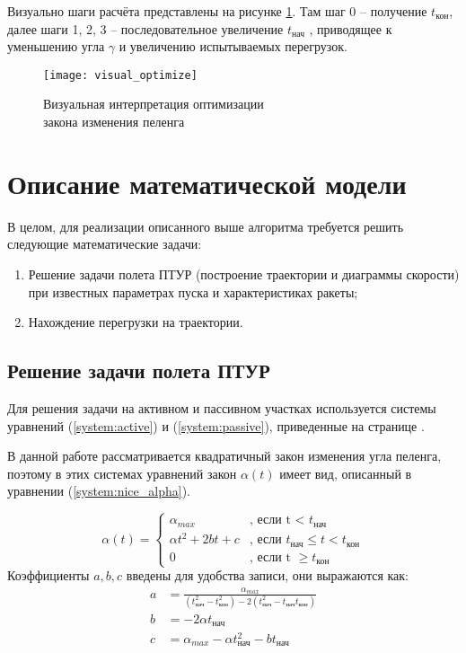 Визуально шаги расчёта представлены на рисунке \ref{fig:visual_optimize}. Там шаг 0 – получение $t_\text{кон}$, далее шаги 1, 2, 3 – последовательное увеличение $t_\text{нач}$ , приводящее к уменьшению угла $\gamma$ и увеличению испытываемых перегрузок.
\begin{figure}[!h]
\begin{center}
	\texttt{[image: visual\_optimize]}
	\caption{Визуальная интерпретация оптимизации\\ закона изменения пеленга}
	\label{fig:visual_optimize}
\end{center}
\end{figure}

\section{Описание математической модели}
В целом, для реализации описанного выше алгоритма требуется решить следующие математические задачи:
\begin{enumerate}[1.]
	\item Решение задачи полета ПТУР (построение траектории и диаграммы скорости) при известных параметрах пуска и характеристиках ракеты;
	\item Нахождение перегрузки на траектории.
\end{enumerate}

\subsection{Решение задачи полета ПТУР}
Для решения задачи на активном и пассивном участках используется системы уравнений (\ref{system:active}) и (\ref{system:passive}), приведенные на странице \pageref{system:active}.

В данной работе рассматривается квадратичный закон изменения угла пеленга, поэтому в этих системах уравнений закон $\alpha(t)$ имеет вид, описанный в уравнении (\ref{system:nice_alpha}).

\begin{equation}
	\label{system:nice_alpha}
	\alpha(t) = \begin{cases}
		\alpha_{max} & \text{, если t < } t_\text{нач} \\
		\alpha t^2 + 2bt + c &  \text{, если } t_\text{нач} \le t < t_\text{кон} \\
		0 &  \text{, если t } \ge t_\text{кон}
	\end{cases}
\end{equation}
Коэффициенты $a, b, c$ введены для удобства записи, они выражаются как:
\begin{align*}
a & = \frac{\alpha_{max}}{ (t_\text{нач}^2 - t_\text{кон}^2) - 2(t_\text{нач}^2-t_\text{нач} t_\text{кон}) } \\
b & = -2 \alpha t_\text{нач} \\
c & = \alpha_{max} - \alpha t_\text{нач}^2 - b t_\text{нач}
\end{align*}

